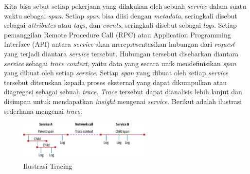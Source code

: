 Kita bisa sebut setiap pekerjaan yang dilakukan oleh sebuah \textit{service} dalam suatu waktu sebagai \textit{span}.
Setiap \textit{span} bisa diisi dengan \textit{metadata}, seringkali disebut sebagai \textit{attributes} atau \textit{tags}, dan \textit{events}, seringkali disebut sebagai \textit{logs}.
Setiap pemanggilan Remote Procedure Call (RPC) atau Application Programming Interface (API) antara \textit{service} akan merepresentasikan hubungan dari \textit{request} yang terjadi diantara \textit{service} tersebut.
Hubungan tersebut disebarkan diantara \textit{service} sebagai \textit{trace context}, yaitu data yang secara unik mendefinisikan \textit{span} yang dibuat oleh setiap \textit{service}.
Setiap \textit{span} yang dibuat oleh setiap \textit{service} tersebut diteruskan kepada proses eksternal yang dapat dikumpulkan atau diagregasi sebagai sebuah \textit{trace}.
\textit{Trace} tersebut dapat dianalisis lebih lanjut dan disimpan untuk mendapatkan \textit{insight} mengenai \textit{service}.
Berikut adalah ilustrasi sederhana mengenai \textit{trace}:
\begin{figure}[htb]
      \centering
      \includegraphics[width=0.6\textwidth]{resources/ch2/tracing-illus.png}
      \caption{Ilustrasi Tracing}
      \label{TracingIlllustration}
\end{figure}

